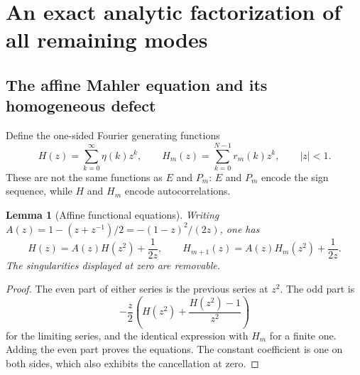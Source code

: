 \documentclass[11pt,a4paper]{article}
\numberwithin{equation}{section}
\newtheorem{lemma}[theorem]{Lemma}
\theoremstyle{definition}
\theoremstyle{remark}
\begin{document}
\section{An exact analytic factorization of all remaining modes}
\label{sec:analytic}

\subsection{The affine Mahler equation and its homogeneous defect}
Define the one-sided Fourier generating functions
\begin{equation}
 H(z)=\sum_{k=0}^{\infty}\eta(k)z^k,\qquad
 H_m(z)=\sum_{k=0}^{N-1}r_m(k)z^k,\qquad |z|<1.
 \label{eq:H}
\end{equation}
These are not the same functions as $E$ and $P_m$: $E$ and $P_m$ encode the
sign sequence, while $H$ and $H_m$ encode autocorrelations.

\begin{lemma}[Affine functional equations]
\label{lem:MahlerH}
Writing $A(z)=1-(z+z^{-1})/2=-(1-z)^2/(2z)$, one has
\begin{equation}
 H(z)=A(z)H(z^2)+\frac1{2z},\qquad
 H_{m+1}(z)=A(z)H_m(z^2)+\frac1{2z}.
 \label{eq:H-Mahler}
\end{equation}
The singularities displayed at zero are removable.
\end{lemma}
\begin{proof}
The even part of either series is the previous series at $z^2$. The odd part is
\[
 -\frac z2\left(H(z^2)+\frac{H(z^2)-1}{z^2}\right)
\]
for the limiting series, and the identical expression with $H_m$ for a finite
one. Adding the even part proves the equations. The constant coefficient is
one on both sides, which also exhibits the cancellation at zero.
\end{proof}
\end{document}

